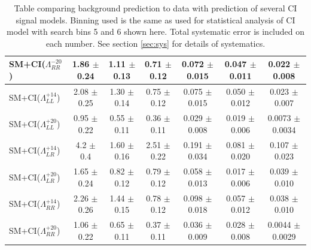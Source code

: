 \begin {table}[h]
\begin{center}
\begin{tabular}{  l | c c c | c c c  }
			SM+CI($\Lambda^{-20}_{RR}$) & 1.86 $\pm$ 0.24 & 1.11 $\pm$ 0.13 & 0.71 $\pm$ 0.12 & 0.072 $\pm$ 0.015 & 0.047 $\pm$ 0.011 & 0.022 $\pm$ 0.008 \\
			\hline
			SM+CI($\Lambda^{+14}_{LL}$) & 2.08 $\pm$ 0.25 & 1.30 $\pm$ 0.14 & 0.75 $\pm$ 0.12 & 0.075 $\pm$ 0.015 & 0.050 $\pm$ 0.012 & 0.023 $\pm$ 0.007 \\
			SM+CI($\Lambda^{+20}_{LL}$) & 0.95 $\pm$ 0.22 & 0.55 $\pm$ 0.11 & 0.36 $\pm$ 0.11 & 0.029 $\pm$ 0.008 & 0.019 $\pm$ 0.006 & 0.0073 $\pm$ 0.0034 \\
			SM+CI($\Lambda^{+14}_{LR}$) & 4.2 $\pm$ 0.4 & 1.60 $\pm$ 0.16 & 2.51 $\pm$ 0.22 & 0.191 $\pm$ 0.034 & 0.081 $\pm$ 0.020 & 0.107 $\pm$ 0.023 \\
			SM+CI($\Lambda^{+20}_{LR}$) & 1.65 $\pm$ 0.24 & 0.82 $\pm$ 0.12 & 0.79 $\pm$ 0.12 & 0.058 $\pm$ 0.013 & 0.017 $\pm$ 0.006 & 0.039 $\pm$ 0.010 \\
			SM+CI($\Lambda^{+14}_{RR}$) & 2.26 $\pm$ 0.26 & 1.44 $\pm$ 0.15 & 0.78 $\pm$ 0.12 & 0.098 $\pm$ 0.018 & 0.057 $\pm$ 0.012 & 0.038 $\pm$ 0.010 \\
			SM+CI($\Lambda^{+20}_{RR}$) & 1.06 $\pm$ 0.22 & 0.65 $\pm$ 0.11 & 0.37 $\pm$ 0.11 & 0.036 $\pm$ 0.009 & 0.028 $\pm$ 0.008 & 0.0044 $\pm$ 0.0029 \\
			\hline
	    	\hline
	  	\end{tabular}
	  	\caption{Table comparing background prediction to data with prediction of several CI signal models. Binning used is the same as used for statistical analysis of CI model with search bins 5 and 6 shown here. Total systematic error is included on each number. See section \ref{sec:sys} for details of systematics.}
	  	\label{tab:CI_results3}
	  	\end{center}
	\end {table}






